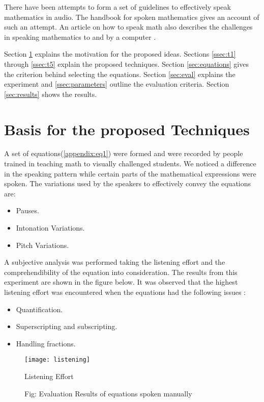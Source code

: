 \documentclass{article}
\begin{document}
There have been attempts to form a set of guidelines to effectively speak mathematics in audio. The handbook for spoken mathematics \cite{chang1983handbook} gives an account of such an attempt. An article on how to speak math also describes the challenges in speaking mathematics to and by a computer \cite{fateman1998can}. 

Section \ref{sec:basis} explains the motivation for the proposed ideas. Sections \ref{ssec:t1} through \ref{ssec:t5} explain the proposed techniques.  Section \ref{sec:equations} gives the criterion behind selecting the equations. Section \ref{sec:eval} explains the experiment and \ref{ssec:parameters} outline the evaluation criteria. Section \ref{sec:results} shows the results.




\section{Basis for the proposed Techniques}
\label{sec:basis}


A set of equations(\ref{appendix:eq1})  were formed and were recorded by people trained in teaching math to visually challenged students. We noticed a difference in the speaking pattern while certain parts of the mathematical expressions were spoken. The variations used by the speakers to effectively convey the equations are:
\begin{itemize}
   \item Pauses.
   \item Intonation Variations.
   \item Pitch Variations.
   \end{itemize}


  A subjective analysis was performed taking the listening effort and the comprehendibility of the equation into consideration. The results from this experiment are shown in the figure below.  It was observed that the highest listening effort was encountered when the equations had the following issues :
\begin{itemize}
   \item Quantification.
   \item Superscripting and subscripting.
\item Handling fractions.
   \end{itemize}

\begin{figure}[h]
\label{fig:res}

\begin{minipage}[b]{1.0\linewidth}
  \centering
  \centerline{\texttt{[image: listening]}}
 \centerline{Listening Effort}\medskip
  \centerline{Fig: Evaluation Results of equations spoken manually}\medskip
\end{minipage}
\end{figure}
\end{document}
